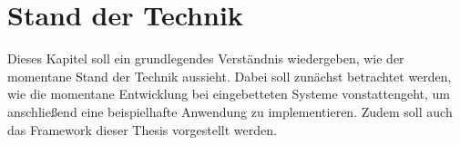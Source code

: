 \chapter{Stand der Technik}
\label{chap:standTechnik}
Dieses Kapitel soll ein grundlegendes Verständnis wiedergeben, wie der momentane Stand der
Technik aussieht. Dabei soll zunächst betrachtet werden, wie die
momentane Entwicklung bei eingebetteten Systeme vonstattengeht, um anschließend eine
beispielhafte Anwendung zu implementieren. Zudem soll auch das Framework dieser Thesis
vorgestellt werden.

